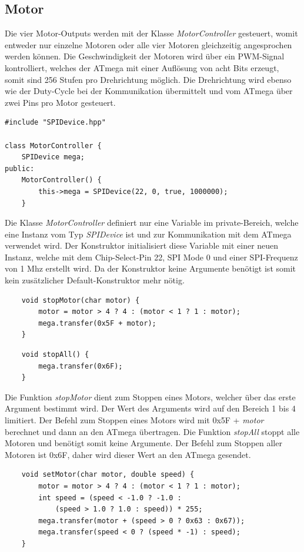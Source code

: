 \documentclass[12pt]{article}
\begin{document}
\subsection{Motor}
Die vier Motor-Outputs werden mit der Klasse \textit{MotorController} gesteuert, womit entweder nur einzelne Motoren oder alle vier Motoren gleichzeitig angesprochen werden können. Die Geschwindigkeit der Motoren wird über ein PWM-Signal kontrolliert, welches der ATmega mit einer Auflösung von acht Bits erzeugt, somit sind 256 Stufen pro Drehrichtung möglich. Die Drehrichtung wird ebenso wie der Duty-Cycle bei der Kommunikation übermittelt und vom ATmega über zwei Pins pro Motor gesteuert.\\
\begin{verbatim}
#include "SPIDevice.hpp"

class MotorController {
    SPIDevice mega;
public:
    MotorController() {
        this->mega = SPIDevice(22, 0, true, 1000000);  
    }
\end{verbatim}
\vspace{-2mm}
Die Klasse \textit{MotorController} definiert nur eine Variable im private-Bereich, welche eine Instanz vom Typ \textit{SPIDevice} ist und zur Kommunikation mit dem ATmega verwendet wird. Der Konstruktor initialisiert diese Variable mit einer neuen Instanz, welche mit dem Chip-Select-Pin 22, SPI Mode 0 und einer SPI-Frequenz von 1 Mhz erstellt wird. Da der Konstruktor keine Argumente benötigt ist somit kein zusätzlicher Default-Konstruktor mehr nötig.\\
\begin{verbatim}
    void stopMotor(char motor) {
        motor = motor > 4 ? 4 : (motor < 1 ? 1 : motor);  
        mega.transfer(0x5F + motor);
    }
\end{verbatim}
\begin{verbatim}
    void stopAll() {
        mega.transfer(0x6F); 
    }
\end{verbatim}
\vspace{-2mm}
Die Funktion \textit{stopMotor} dient zum Stoppen eines Motors, welcher über das erste Argument bestimmt wird. Der Wert des Arguments wird auf den Bereich 1 bis 4 limitiert. Der Befehl zum Stoppen eines Motors wird mit 0x5F + \textit{motor} berechnet und dann an den ATmega übertragen.
Die Funktion \textit{stopAll} stoppt alle Motoren und benötigt somit keine Argumente. Der Befehl zum Stoppen aller Motoren ist 0x6F, daher wird dieser Wert an den ATmega gesendet.\\
\begin{verbatim}
    void setMotor(char motor, double speed) {
        motor = motor > 4 ? 4 : (motor < 1 ? 1 : motor);  
        int speed = (speed < -1.0 ? -1.0 : 
            (speed > 1.0 ? 1.0 : speed)) * 255;
        mega.transfer(motor + (speed > 0 ? 0x63 : 0x67));
        mega.transfer(speed < 0 ? (speed * -1) : speed);
    }
\end{verbatim}
\end{document}
